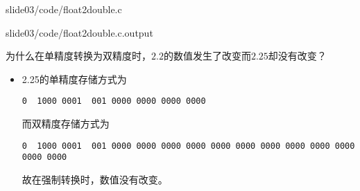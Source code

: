 %
\begin{frame}[fragile]


{slide03/code/float2double.c}
\pause 

{slide03/code/float2double.c.output}
\end{frame}
\begin{frame}[fragile]
\begin{question}[]{}
  为什么在单精度转换为双精度时，$2.2$的数值发生了改变而$2.25$却没有改变？
\end{question} 
\pause 
\begin{itemize}
\item 2.25的单精度存储方式为
\begin{lstlisting}
0  1000 0001  001 0000 0000 0000 0000
\end{lstlisting}
而双精度存储方式为
\begin{lstlisting}[basicstyle=\ttfamily\tiny]
0  1000 0001  001 0000 0000 0000 0000 0000 0000 0000 0000 0000 0000 0000 0000
\end{lstlisting}
故在强制转换时，数值没有改变。
\end{itemize}

\end{frame}

